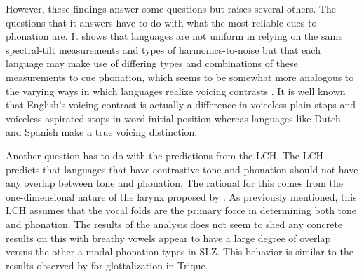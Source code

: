 \documentclass[12pt, letterpaper]{article}
\begin{document}
However, these findings answer some questions but raises several others. The questions that it answers have to do with what the most reliable cues to phonation are. It shows that languages are not uniform in relying on the same spectral-tilt measurements and types of harmonics-to-noise but that each language may make use of differing types and combinations of these measurements to cue phonation, which seems to be somewhat more analogous to the varying ways in which languages realize voicing contrasts \citep{liskerCrossLanguageStudyVoicing1964}. It is well known that English's voicing contrast is actually a difference in voiceless plain stops and voiceless aspirated stops in word-initial position whereas languages like Dutch and Spanish make a true voicing distinction. 

Another question has to do with the predictions from the LCH. The LCH predicts that languages that have contrastive tone and phonation should not have any overlap between tone and phonation. The rational for this comes from the one-dimensional nature of the larynx proposed by \citet{ladefogedPreliminariesLinguisticPhonetics1971}. As previously mentioned, this LCH assumes that the vocal folds are the primary force in determining both tone and phonation. The results of the analysis does not seem to shed any concrete results on this with breathy vowels appear to have a large degree of overlap versus the other a-modal phonation types in SLZ. This behavior is similar to the results observed by \citet{dicanioCoarticulationToneGlottal2012} for glottalization in Trique.
\end{document}
